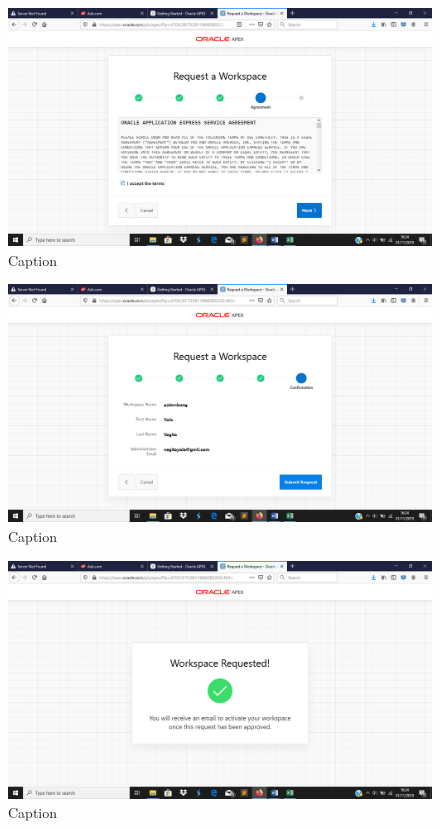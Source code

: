 \begin{enumerate}
    \begin{figure}[!htbp]
        \centering
        \includegraphics[scale=0.3]{figure/6.png}
        \caption{Caption}
        \label{fig:my_label}
    \end{figure}
    
    \begin{figure}[!htbp]
        \centering
        \includegraphics[scale=0.3]{figure/7.png}
        \caption{Caption}
        \label{fig:my_label}
    \end{figure}
    \begin{figure}[!htbp]
        \centering
        \includegraphics[scale=0.3]{figure/8.png}
        \caption{Caption}
        \label{fig:my_label}
    \end{figure}
    

\end{enumerate}
